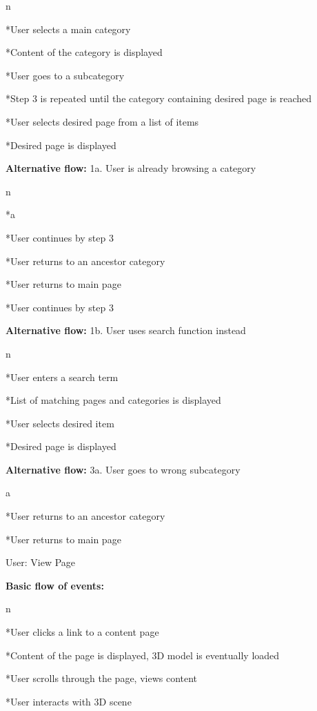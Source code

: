 \begitems \style n

*User selects a main category

*Content of the category is displayed

*User goes to a subcategory

*Step 3 is repeated until the category containing desired page is reached

*User selects desired page from a list of items

*Desired page is displayed

\enditems

{\bf Alternative flow:} 1a. User is already browsing a category

\begitems \style n

*\begitems \style a

*User continues by step 3

*User returns to an ancestor category

*User returns to main page

\enditems

*User continues by step 3

\enditems

{\bf Alternative flow:} 1b. User uses search function instead

\begitems \style n

*User enters a search term

*List of matching pages and categories is displayed

*User selects desired item

*Desired page is displayed

\enditems

{\bf Alternative flow:} 3a. User goes to wrong subcategory

\begitems \style a

*User returns to an ancestor category

*User returns to main page

\enditems

\secc User: View Page

{\bf Basic flow of events:}

\begitems \style n

*User clicks a link to a content page

*Content of the page is displayed, 3D model is eventually loaded

*User scrolls through the page, views content

*User interacts with 3D scene

